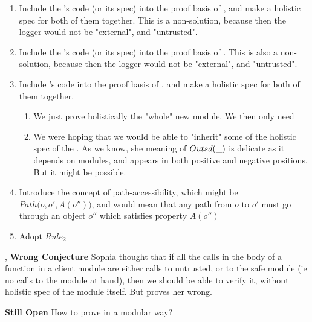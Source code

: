 \begin{enumerate}
\item
Include the 's code (or its spec) into the proof basis of , and make a holistic spec for both of them together. This is a non-solution, because then the logger would not be "external", and "untrusted".
\item
Include the 's code (or its spec) into the proof basis of . This is also a non-solution, because then the logger would not be "external", and "untrusted".
\item
Include  's code  into the proof basis of , and make a holistic spec for both of them together. 
\begin{enumerate}
\item
We just prove holistically the "whole" new module. We then only need 
\item
We were hoping that we would be able to "inherit" some of the holistic spec of the . As we know, she meaning of $Outsd(\_)$ is delicate as it depends on modules, and appears in both positive and negative positions. But it might be possible.
\end{enumerate}
\item
Introduce the concept of path-accessibility, which might be $Path( {o}, {o'}, {A(o''))}$, and would mean that any path from $o$ to $o'$  must go through an object $o''$ which satisfies  property $A(o'')$
\item
 Adopt $Rule_2$

\end{enumerate}

\noindent,
\textbf{Wrong Conjecture}  Sophia thought that if all the calls in  the body of a function in a client module are either calls to untrusted, or to the safe module (ie no calls to the module at hand), then we should be able to verify it, without holistic spec of the module itself. But  proves her wrong.

\vspace{.1in}

\textbf{Still Open} How to prove   in a modular way?

